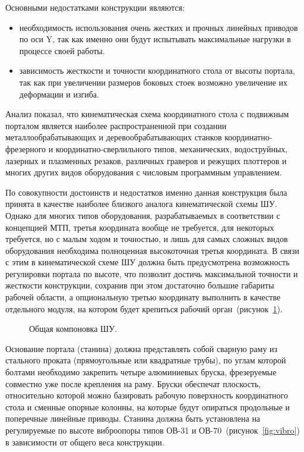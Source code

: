 Основными недостатками конструкции являются:

\begin{itemize}
	\item необходимость использования очень жестких и прочных линейных приводов по оси Y, так как именно они будут испытывать максимальные нагрузки в процессе своей работы.
	
	\item зависимость жесткости и точности координатного стола от высоты портала, так как при увеличении размеров боковых стоек возможно увеличение их деформации и изгиба.
\end{itemize}

Анализ показал, что кинематическая схема координатного стола с подвижным порталом является наиболее распространенной при создании металлообрабатывающих и деревообрабатывающих станков координатно-фрезерного и координатно-сверлильного типов, механических, водоструйных, лазерных и плазменных резаков, различных граверов и режущих плоттеров и многих других видов оборудования с числовым программным управлением.

По совокупности достоинств и недостатков именно данная конструкция была принята в качестве наиболее близкого аналога кинематической схемы ШУ. Однако для многих типов оборудования, разрабатываемых в соответствии с концепцией МТП, третья координата вообще не требуется, для некоторых требуется, но с малым ходом и точностью, и лишь для самых сложных видов оборудования необходима полноценная высокоточная третья координата. В связи с этим в кинематической схеме ШУ должна быть предусмотрена возможность регулировки портала по высоте, что позволит достичь максимальной точности и жесткости конструкции, сохранив при этом достаточно большие габариты рабочей области, а опциональную третью координату выполнить в качестве отдельного модуля, на котором будет крепиться рабочий орган~(рисунок~\cref{fig:coord-chassis}).

\begin{figure}[ht]
	\caption{Общая компоновка ШУ.}\label{fig:coord-chassis}
\end{figure}

Основание портала (станина) должна представлять собой сварную раму из стального проката (прямоугольные или квадратные трубы), по углам которой болтами необходимо закрепить четыре алюминиевых бруска, фрезеруемые совместно уже после крепления на раму. Бруски обеспечат плоскость, относительно которой можно базировать рабочую поверхность координатного стола и сменные опорные колонны, на которые будут опираться продольные и поперечные линейные приводы. Станина должна быть установлена на регулируемые по высоте виброопоры типов ОВ-31 и ОВ-70~(рисунок~\cref{fig:vibro}) в зависимости от общего веса конструкции.

